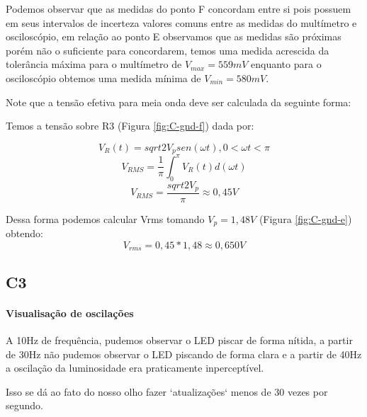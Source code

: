     Podemos observar que as medidas do ponto F 
    concordam entre si pois possuem em seus 
    intervalos de incerteza valores comuns 
    entre as medidas do multímetro e 
    osciloscópio, em relação ao ponto E 
    observamos que as medidas são próximas 
    porém não o suficiente para concordarem, 
    temos uma medida acrescida da tolerância 
    máxima para o multímetro de $V_{max} = 559mV$ 
    enquanto para o osciloscópio obtemos uma 
    medida mínima de $V_{min} = 580mV$.

    Note que a tensão efetiva para meia onda deve ser calculada da seguinte forma:
    
    Temos a tensão sobre R3 (Figura \ref{fig:C-gnd-f}) dada por:

    $$V_R(t) = sqrt{2}V_p sen(\omega t), 0 < \omega t < \pi$$
    $$V_{RMS} = \frac{1}{\pi} \int_{0}^{\pi} V_R(t) d(\omega t)$$
    $$V_{RMS} = \frac{sqrt{2}V_p}{\pi} \approx 0,45 V$$

    Dessa forma podemos calcular Vrms tomando $V_p = 1,48 V$ (Figura \ref{fig:C-gnd-e}) obtendo:
    $$V_{rms} = 0,45 * 1,48 \approx 0,650 V$$

    \subsection{C3}

    \paragraph{Visualisação de oscilações}

    A 10Hz de frequência, pudemos observar 
    o LED piscar de forma nítida, a partir 
    de 30Hz não pudemos observar o LED 
    piscando de forma clara e a partir de 
    40Hz a oscilação da luminosidade era 
    praticamente inperceptível.

    Isso se dá ao fato do nosso olho fazer 
    `atualizações` menos de 30 vezes por segundo.